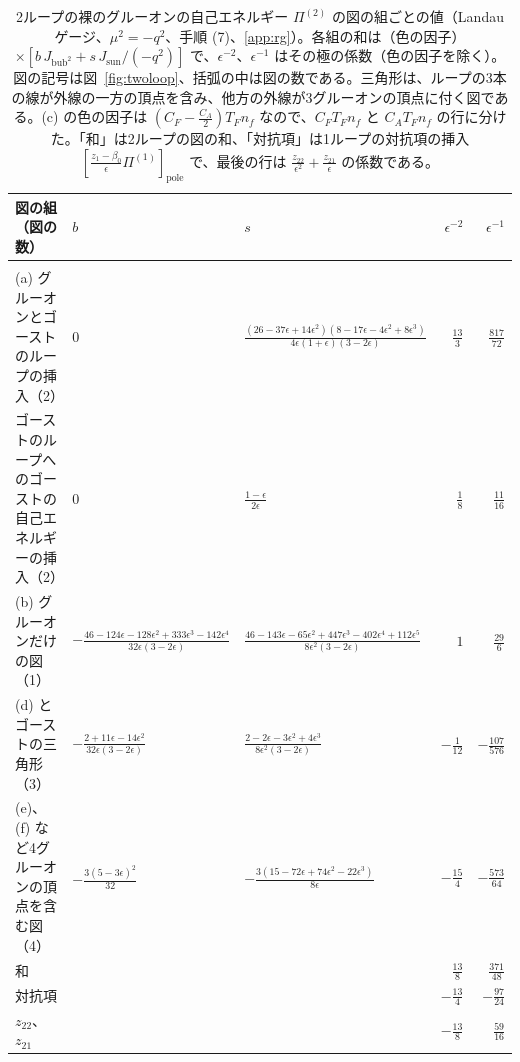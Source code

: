 \documentclass[a4paper,10pt]{ltjsarticle}
\begin{document}
\begin{table}[tbp]
\centering\small
\renewcommand{\arraystretch}{1.3}
\caption{2ループの裸のグルーオンの自己エネルギー $\Pi^{(2)}$ の図の組ごとの値（Landau ゲージ、$\mu^2=-q^2$、手順 (7)、\ref{app:rg}）。各組の和は（色の因子）$\times[b\,J_{\mathrm{bub}^2}+s\,J_{\mathrm{sun}}/(-q^2)]$ で、$\epsilon^{-2}$、$\epsilon^{-1}$ はその極の係数（色の因子を除く）。図の記号は図~\ref{fig:twoloop}、括弧の中は図の数である。三角形は、ループの3本の線が外線の一方の頂点を含み、他方の外線が3グルーオンの頂点に付く図である。(c) の色の因子は $(C_F-\frac{C_A}2)T_Fn_f$ なので、$C_FT_Fn_f$ と $C_AT_Fn_f$ の行に分けた。「和」は2ループの図の和、「対抗項」は1ループの対抗項の挿入 $[\frac{z_1-\beta_0}\epsilon\Pi^{(1)}]_{\mathrm{pole}}$ で、最後の行は $\frac{z_{22}}{\epsilon^2}+\frac{z_{21}}\epsilon$ の係数である。}
\label{tab:twoloopclass}
\begin{tabular}{>{\raggedright\arraybackslash}p{4.1cm}llrr}
\toprule
図の組（図の数） & $b$ & $s$ & $\epsilon^{-2}$ & $\epsilon^{-1}$ \\
\midrule
\multicolumn{5}{l}{$C_A^2$ の部分} \\
(a) グルーオンとゴーストのループの挿入（2） & $0$ & $\frac{(26-37\epsilon+14\epsilon^2)(8-17\epsilon-4\epsilon^2+8\epsilon^3)}{4\epsilon(1+\epsilon)(3-2\epsilon)}$ & $\frac{13}3$ & $\frac{817}{72}$ \\
ゴーストのループへのゴーストの自己エネルギーの挿入（2） & $0$ & $\frac{1-\epsilon}{2\epsilon}$ & $\frac18$ & $\frac{11}{16}$ \\
(b) グルーオンだけの図（1） & $-\frac{46-124\epsilon-128\epsilon^2+333\epsilon^3-142\epsilon^4}{32\epsilon(3-2\epsilon)}$ & $\frac{46-143\epsilon-65\epsilon^2+447\epsilon^3-402\epsilon^4+112\epsilon^5}{8\epsilon^2(3-2\epsilon)}$ & $1$ & $\frac{29}6$ \\
(d) とゴーストの三角形（3） & $-\frac{2+11\epsilon-14\epsilon^2}{32\epsilon(3-2\epsilon)}$ & $\frac{2-2\epsilon-3\epsilon^2+4\epsilon^3}{8\epsilon^2(3-2\epsilon)}$ & $-\frac1{12}$ & $-\frac{107}{576}$ \\
(e)、(f) など4グルーオンの頂点を含む図（4） & $-\frac{3(5-3\epsilon)^2}{32}$ & $-\frac{3(15-72\epsilon+74\epsilon^2-22\epsilon^3)}{8\epsilon}$ & $-\frac{15}4$ & $-\frac{573}{64}$ \\
和 & & & $\frac{13}8$ & $\frac{371}{48}$ \\
対抗項 & & & $-\frac{13}4$ & $-\frac{97}{24}$ \\
$z_{22}$、$z_{21}$ & & & $-\frac{13}8$ & $\frac{59}{16}$ \\

\end{tabular}
\end{table}
\end{document}
